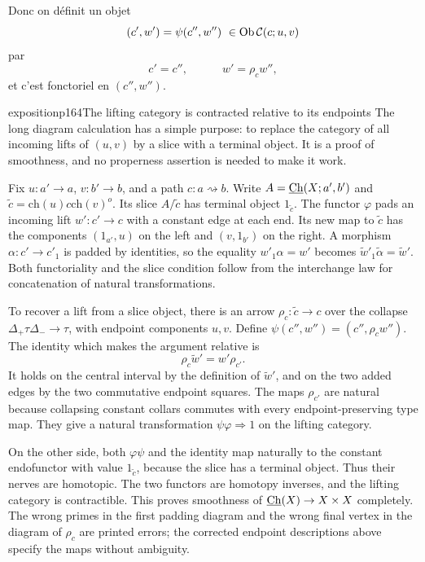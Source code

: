 Donc on définit un objet
\[
(c',w') = \psi(c'',w'')\ \in \operatorname{Ob} \mathcal{C}(c;u,v)
\]
par
\[
c' = c'', \qquad\quad w' = \rho_c w'',
\]
et c'est fonctoriel en $(c'',w'')$.

\begin{dcomment}{exposition}{p164}{The lifting category is contracted relative to its endpoints}
The long diagram calculation has a simple purpose: to replace the category of all incoming lifts of $(u,v)$ by a slice with a terminal object. It is a proof of smoothness, and no properness assertion is needed to make it work.

Fix $u:a'\to a$, $v:b'\to b$, and a path $c:a\rightsquigarrow b$. Write $A=\underline{\mathrm{Ch}}(X;a',b')$ and $\widetilde c=\mathrm{ch}(u)c\mathrm{ch}(v)^o$. Its slice $A/\widetilde c$ has terminal object $1_{\widetilde c}$. The functor $\varphi$ pads an incoming lift $w':c'\to c$ with a constant edge at each end. Its new map to $\widetilde c$ has the components $(1_{a'},u)$ on the left and $(v,1_{b'})$ on the right. A morphism $\alpha:c'\to c'_1$ is padded by identities, so the equality $w'_1\alpha=w'$ becomes $\widetilde w'_1\widetilde\alpha=\widetilde w'$. Both functoriality and the slice condition follow from the interchange law for concatenation of natural transformations.

To recover a lift from a slice object, there is an arrow $\rho_c:\widetilde c\to c$ over the collapse $\Delta_+\tau\Delta_-\to\tau$, with endpoint components $u,v$. Define $\psi(c'',w'')=(c'',\rho_cw'')$. The identity which makes the argument relative is
\[
 \rho_c\widetilde w'=w'\rho_{c'}.
\]
It holds on the central interval by the definition of $\widetilde w'$, and on the two added edges by the two commutative endpoint squares. The maps $\rho_{c'}$ are natural because collapsing constant collars commutes with every endpoint-preserving type map. They give a natural transformation $\psi\varphi\Rightarrow1$ on the lifting category.

On the other side, both $\varphi\psi$ and the identity map naturally to the constant endofunctor with value $1_{\widetilde c}$, because the slice has a terminal object. Thus their nerves are homotopic. The two functors are homotopy inverses, and the lifting category is contractible. This proves smoothness of $\underline{\mathrm{Ch}}(X)\to X\times X$ completely. The wrong primes in the first padding diagram and the wrong final vertex in the diagram of $\rho_c$ are printed errors; the corrected endpoint descriptions above specify the maps without ambiguity.
\end{dcomment}


